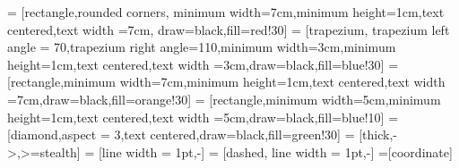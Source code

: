 \begin{lrbox}{\mysavebox}%
 = [rectangle,rounded corners, minimum width=7cm,minimum height=1cm,text centered,text width =7cm, draw=black,fill=red!30]
 = [trapezium, trapezium left angle = 70,trapezium right angle=110,minimum width=3cm,minimum height=1cm,text centered,text width =3cm,draw=black,fill=blue!30]
 = [rectangle,minimum width=7cm,minimum height=1cm,text centered,text width =7cm,draw=black,fill=orange!30]
 = [rectangle,minimum width=5cm,minimum height=1cm,text centered,text width =5cm,draw=black,fill=blue!10]
 = [diamond,aspect = 3,text centered,draw=black,fill=green!30]
 = [thick,->,>=stealth]
 = [line width = 1pt,-]
 = [dashed, line width = 1pt,-]
=[coordinate]


\end{lrbox}
